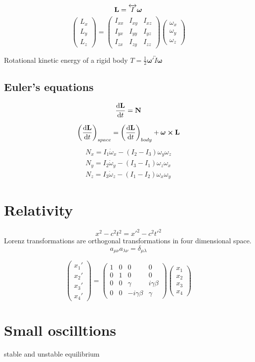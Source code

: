 \documentclass[12pt]{article}
\begin{document}
\[\vb{L}=\overleftrightarrow{I}\bm{\omega}\]
\[
\begin{pmatrix}
L_x\\L_y\\L_z
\end{pmatrix}
=
\begin{pmatrix}
I_{xx}& I_{xy}& I_{xz}\\
I_{yx}& I_{yy}& I_{yz}\\
I_{zx}& I_{zy}& I_{zz}
\end{pmatrix}
\begin{pmatrix}
\omega_x\\ \omega_y\\ \omega_z
\end{pmatrix}
\]

Rotational kinetic energy of a rigid body $T=\frac{1}{2}\bm{\omega}'\overleftrightarrow{I}\bm{\omega}$
\subsection*{Euler's equations}
\[\dv{\vb{L}}{t}=\vb{N}\]

\[\qty(\dv{\vb{L}}{t})_{space}=\qty(\dv{\vb{L}}{t})_{body}+\bm{\omega}\cp\vb{L}\]
\begin{align*}
N_x=I_1\dot{\omega}_x-(I_2-I_3){\omega}_y{\omega}_z\\
N_y=I_2\dot{\omega}_y-(I_3-I_1){\omega}_z{\omega}_x\\
N_z=I_3\dot{\omega}_z-(I_1-I_2){\omega}_x{\omega}_y
\end{align*}
\section*{Relativity}

\[x^2-c^2t^2=x'^2-c^2t'^2\]
Lorenz transformations are orthogonal transformations in four dimensional space.
\[a_{\mu\nu}a_{\lambda\nu}=\delta_{\mu\lambda}\]

\[
\begin{pmatrix}
x_1'\\ x_2'\\ x_3'\\ x_4'
\end{pmatrix}
=
\begin{pmatrix}
1& 0& 0& 0\\ 0& 1& 0& 0\\ 0& 0& \gamma& i\gamma\beta\\ 0& 0& -i\gamma\beta& \gamma
\end{pmatrix}
\begin{pmatrix}
x_1\\ x_2\\ x_3\\ x_4
\end{pmatrix}
\]

\section*{Small oscilltions}
stable and unstable equilibrium
\end{document}
